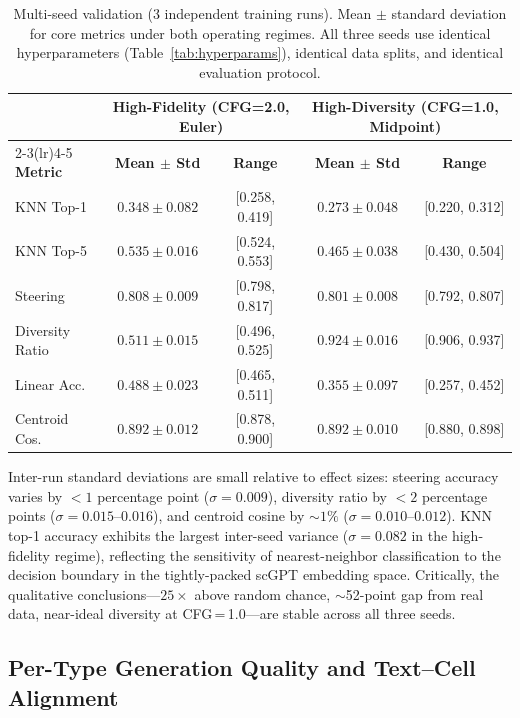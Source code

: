 \documentclass[11pt,a4paper]{article}
\begin{document}
\begin{table}[!htbp]
\caption{Multi-seed validation (3 independent training runs). Mean $\pm$ standard deviation for core metrics under both operating regimes. All three seeds use identical hyperparameters (Table~\ref{tab:hyperparams}), identical data splits, and identical evaluation protocol.\label{tab:multi-seed}}
\centering
\small
\begin{tabular}{lcccc}
\toprule
 & \multicolumn{2}{c}{\textbf{High-Fidelity (CFG=2.0, Euler)}} & \multicolumn{2}{c}{\textbf{High-Diversity (CFG=1.0, Midpoint)}} \\
\cmidrule(lr){2-3}\cmidrule(lr){4-5}
\textbf{Metric} & \textbf{Mean $\pm$ Std} & \textbf{Range} & \textbf{Mean $\pm$ Std} & \textbf{Range} \\
\midrule
KNN Top-1      & $0.348 \pm 0.082$ & [0.258, 0.419] & $0.273 \pm 0.048$ & [0.220, 0.312] \\
KNN Top-5      & $0.535 \pm 0.016$ & [0.524, 0.553] & $0.465 \pm 0.038$ & [0.430, 0.504] \\
Steering       & $0.808 \pm 0.009$ & [0.798, 0.817] & $0.801 \pm 0.008$ & [0.792, 0.807] \\
Diversity Ratio & $0.511 \pm 0.015$ & [0.496, 0.525] & $0.924 \pm 0.016$ & [0.906, 0.937] \\
Linear Acc.    & $0.488 \pm 0.023$ & [0.465, 0.511] & $0.355 \pm 0.097$ & [0.257, 0.452] \\
Centroid Cos.  & $0.892 \pm 0.012$ & [0.878, 0.900] & $0.892 \pm 0.010$ & [0.880, 0.898] \\
\bottomrule
\end{tabular}
\end{table}

Inter-run standard deviations are small relative to effect sizes: steering accuracy varies by $< 1$ percentage point ($\sigma = 0.009$), diversity ratio by $< 2$ percentage points ($\sigma = 0.015$--$0.016$), and centroid cosine by $\sim 1\%$ ($\sigma = 0.010$--$0.012$). KNN top-1 accuracy exhibits the largest inter-seed variance ($\sigma = 0.082$ in the high-fidelity regime), reflecting the sensitivity of nearest-neighbor classification to the decision boundary in the tightly-packed scGPT embedding space. Critically, the qualitative conclusions---$25\times$ above random chance, $\sim$52-point gap from real data, near-ideal diversity at CFG\,=\,1.0---are stable across all three seeds.

\subsection{Per-Type Generation Quality and Text--Cell Alignment}\label{sec:per-type}
\end{document}
